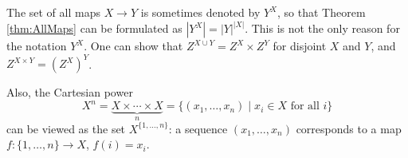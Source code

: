 

\setcounter{section}{2}
\setcounter{subsection}{2}
\setcounter{dfn}{4}

\begin{rem}
The set of all maps $X \to Y$ is sometimes denoted by $Y^X$, so that Theorem \ref{thm:AllMaps} can be formulated as $\left|Y^X\right| = |Y|^{|X|}$.
This is not the only reason for the notation $Y^X$.
One can show that $Z^{X \cup Y} = Z^X \times Z^Y$ for disjoint $X$ and $Y$, and $Z^{X \times Y} = (Z^X)^Y$.

Also, the Cartesian power
\[
X^n = \underbrace{X \times \cdots \times X}_{n} = \{(x_1, \ldots, x_n) \mid x_i \in X \text{ for all }i\}
\]
can be viewed as the set $X^{\{1, \ldots, n\}}$:
a sequence $(x_1, \ldots, x_n)$ corresponds to a map $f \colon \{1, \ldots, n\} \to X$, $f(i) = x_i$.
\end{rem}

